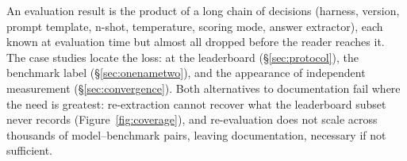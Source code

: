 \documentclass[11pt]{article}
\begin{document}
%
%
An evaluation result is the product of a long chain of decisions (harness,
version, prompt template, n-shot, temperature, scoring mode, answer
extractor), each known at evaluation time but almost all dropped before the
reader reaches it. The case studies locate the loss: at the leaderboard
(\S\ref{sec:protocol}), the benchmark label (\S\ref{sec:onenametwo}), and the
appearance of independent measurement (\S\ref{sec:convergence}). Both
alternatives to documentation fail where the need is greatest: re-extraction
cannot recover what the leaderboard subset never records
(Figure~\ref{fig:coverage}), and re-evaluation does not scale across thousands of
model--benchmark pairs, leaving documentation, necessary if not sufficient.
\end{document}
